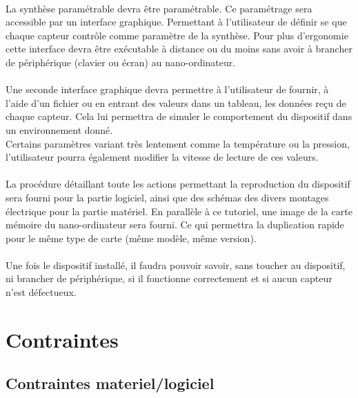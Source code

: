 \documentclass[a4paper, titlepage, oneside, 12pt]{article}%
\begin{document}
\paragraph{}
La synthèse paramétrable devra être paramétrable. Ce paramétrage sera accessible par un interface graphique. Permettant à l'utilisateur de définir se que chaque capteur contrôle comme paramètre de la synthèse. Pour plus d’ergonomie cette interface devra être exécutable à distance ou du moins sans avoir à brancher de périphérique (clavier ou écran) au nano-ordinateur.

\paragraph{}
Une seconde interface graphique devra permettre à l'utilisateur de fournir, à l'aide d'un fichier ou en entrant des valeurs dans un tableau, les données reçu de chaque capteur. Cela lui permettra de simuler le comportement du dispositif dans un environnement donné.\\
Certains paramètres variant très lentement comme la température ou la pression, l'utilisateur pourra également modifier la vitesse de lecture de ces valeurs.

\paragraph{}
La procédure détaillant toute les actions permettant la reproduction du dispositif sera fourni pour la partie logiciel, ainsi que des schémas des divers montages électrique pour la partie matériel. En parallèle à ce tutoriel, une image de la carte mémoire du nano-ordinateur sera fourni. Ce qui permettra la duplication rapide pour le même type de carte (même modèle, même version).

\paragraph{}
Une fois le dispositif installé, il faudra pouvoir savoir, sans toucher au dispositif, ni brancher de périphérique, si il fonctionne correctement et si aucun capteur n'est défectueux.


\section{Contraintes}
\subsection{Contraintes materiel/logiciel}
\end{document}
